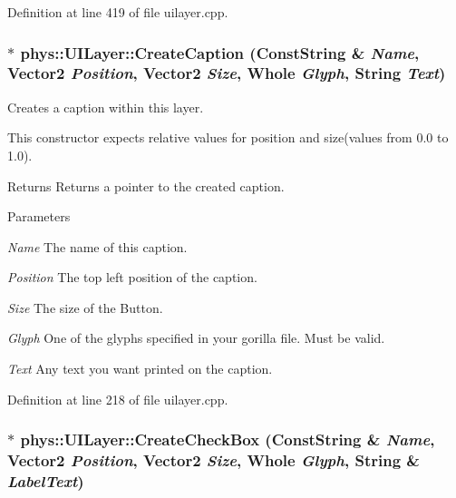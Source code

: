 Definition at line 419 of file uilayer.cpp.

\hypertarget{classphys_1_1UILayer_a859fb1ad868dec6c1f92987780781a27}{
\subsubsection[{CreateCaption}]{ $\ast$ phys::UILayer::CreateCaption ({\bf ConstString} \& {\em Name}, \/  {\bf Vector2} {\em Position}, \/  {\bf Vector2} {\em Size}, \/  {\bf Whole} {\em Glyph}, \/  {\bf String} {\em Text})}}
\label{da/d48/classphys_1_1UILayer_a859fb1ad868dec6c1f92987780781a27}


Creates a caption within this layer. 

This constructor expects relative values for position and size(values from 0.0 to 1.0). \begin{DoxyReturn}{Returns}
Returns a pointer to the created caption. 
\end{DoxyReturn}

\begin{DoxyParams}{Parameters}
\item[{\em Name}]The name of this caption. \item[{\em Position}]The top left position of the caption. \item[{\em Size}]The size of the Button. \item[{\em Glyph}]One of the glyphs specified in your gorilla file. Must be valid. \item[{\em Text}]Any text you want printed on the caption. \end{DoxyParams}


Definition at line 218 of file uilayer.cpp.

\hypertarget{classphys_1_1UILayer_ad9a60f201b1c0d9d891ea985a5a3c1e3}{
\subsubsection[{CreateCheckBox}]{ $\ast$ phys::UILayer::CreateCheckBox ({\bf ConstString} \& {\em Name}, \/  {\bf Vector2} {\em Position}, \/  {\bf Vector2} {\em Size}, \/  {\bf Whole} {\em Glyph}, \/  {\bf String} \& {\em LabelText})}}
\label{da/d48/classphys_1_1UILayer_ad9a60f201b1c0d9d891ea985a5a3c1e3}


